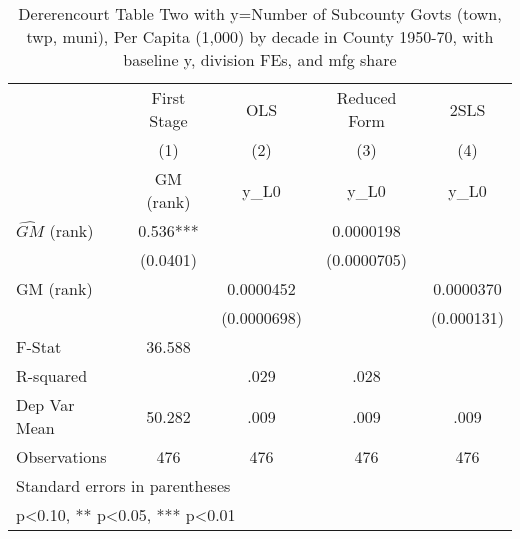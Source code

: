 \begin{table}[htbp]\centering
\def\sym#1{\ifmmode^{#1}\else\(^{#1}\)\fi}
\caption{Dererencourt Table Two with y=Number of Subcounty Govts (town, twp, muni), Per Capita (1,000) by decade in County 1950-70, with baseline y, division FEs, and mfg share}
\begin{tabular}{l*{4}{c}}
\toprule
                    & First Stage   &         OLS   &Reduced Form   &        2SLS   \\
                    &\multicolumn{1}{c}{(1)}&\multicolumn{1}{c}{(2)}&\multicolumn{1}{c}{(3)}&\multicolumn{1}{c}{(4)}\\
                    &\multicolumn{1}{c}{GM  (rank)}&\multicolumn{1}{c}{y\_L0}&\multicolumn{1}{c}{y\_L0}&\multicolumn{1}{c}{y\_L0}\\
\midrule
$\hat{GM}$ (rank)   &       0.536***&               &   0.0000198   &               \\
                    &    (0.0401)   &               & (0.0000705)   &               \\
\addlinespace
GM  (rank)          &               &   0.0000452   &               &   0.0000370   \\
                    &               & (0.0000698)   &               &  (0.000131)   \\
\midrule
F-Stat              &      36.588   &               &               &               \\
R-squared           &               &        .029   &        .028   &               \\
Dep Var Mean        &      50.282   &        .009   &        .009   &        .009   \\
Observations        &         476   &         476   &         476   &         476   \\
\bottomrule
\multicolumn{5}{l}{\footnotesize Standard errors in parentheses}\\
\multicolumn{5}{l}{\footnotesize * p<0.10, ** p<0.05, *** p<0.01}\\
\end{tabular}
\end{table}

